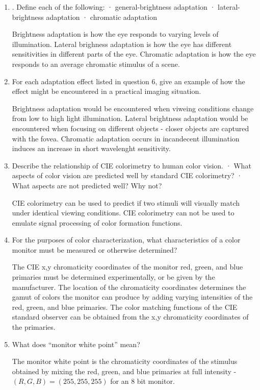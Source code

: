 \documentclass{amsart}
\theoremstyle{definition}
\theoremstyle{remark}
\numberwithin{equation}{section}
\begin{document}
\begin{enumerate}
\item. Define each of the following:
 · general-brightness adaptation
 · lateral-brightness adaptation
 · chromatic adaptation
 \par Brightness adaptation is how the eye responds to varying
 levels of illumination.  Lateral brighness adaptation is how the
 eye has different sensitivities in different parts of the eye.
 Chromatic adaptation is how the eye responds to an average chromatic
 stimulus of a scene.

\item For each adaptation effect listed in question 6, give an
example of how the effect might be encountered in a practical
imaging situation.
\par Brightness adaptation would be encountered when viweing
conditions change from low to high light illumination.  Lateral
brightness adaptation would be encountered when focusing on
different objects - closer objects are captured with the fovea.
Chromatic adaptation occurs in incandecent illumination induces an
increase in short wavelenght sensitivity.

\item Describe the relationship of CIE colorimetry to human color
vision.
 · What aspects of color vision are predicted well by standard CIE colorimetry?
 · What aspects are not predicted well? Why not?
\par CIE colorimetry can be used to predict if two stimuli will
visually match under identical viewing conditions.  CIE
colorimetry can not be used to emulate signal processing of color
formation functions.

\item For the purposes of color characterization, what
characteristics of a color monitor must be measured or otherwise
determined?

\par The CIE x,y chromaticity coordinates of the monitor red, green, and
blue primaries must be determined experimentally, or be given by
the manufacturer.  The location of the chromaticity coordinates
determines the gamut of colors the monitor can produce by adding
varying intensities of the red, green, and blue primaries. The
color matching functions of the CIE standard observer can be
obtained from the x,y chromaticity coordinates of the primaries.

\item What does “monitor white point” mean?

\par The monitor white point is the chromaticity coordinates
of the stimulus obtained by mixing the red, green, and blue
primaries at full intensity - $ (R,G,B)=(255,255,255) $ for an 8
bit monitor.


\end{enumerate}
\end{document}
